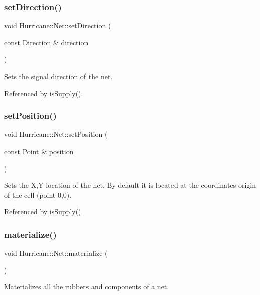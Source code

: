 \subsubsection{\texorpdfstring{set\+Direction()}{setDirection()}}
{\footnotesize\ttfamily void Hurricane\+::\+Net\+::set\+Direction (\begin{DoxyParamCaption}\item[{const \hyperlink{classHurricane_1_1Net_1_1Direction}{Direction} \&}]{direction }\end{DoxyParamCaption})}

Sets the signal direction of the net. 

Referenced by is\+Supply().

\mbox{\label{classHurricane_1_1Net_a0a3a3232a74ebced14b14029c5199561}} 
\subsubsection{\texorpdfstring{set\+Position()}{setPosition()}}
{\footnotesize\ttfamily void Hurricane\+::\+Net\+::set\+Position (\begin{DoxyParamCaption}\item[{const \hyperlink{classHurricane_1_1Point}{Point} \&}]{position }\end{DoxyParamCaption})}

Sets the X,Y location of the net. By default it is located at the coordinates origin of the cell (point 0,0). 

Referenced by is\+Supply().

\mbox{\label{classHurricane_1_1Net_ae46f7e4a9b00b265c06cb6e0ee00b806}} 
\subsubsection{\texorpdfstring{materialize()}{materialize()}}
{\footnotesize\ttfamily void Hurricane\+::\+Net\+::materialize (\begin{DoxyParamCaption}{ }\end{DoxyParamCaption})}

Materializes all the rubbers and components of a net. 


